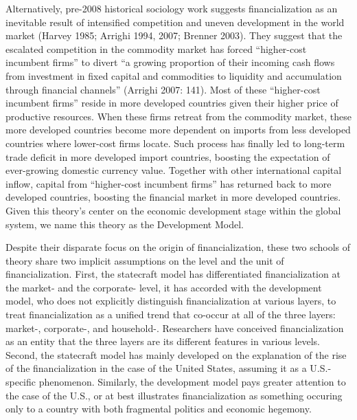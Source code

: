 \documentclass[
]{article}
\begin{document}
Alternatively, pre-2008 historical sociology work suggests
financialization as an inevitable result of intensified competition and
uneven development in the world market (Harvey 1985; Arrighi 1994, 2007;
Brenner 2003). They suggest that the escalated competition in the
commodity market has forced ``higher-cost incumbent firms'' to divert
``a growing proportion of their incoming cash flows from investment in
fixed capital and commodities to liquidity and accumulation through
financial channels'' (Arrighi 2007: 141). Most of these ``higher-cost
incumbent firms'' reside in more developed countries given their higher
price of productive resources. When these firms retreat from the
commodity market, these more developed countries become more dependent
on imports from less developed countries where lower-cost firms locate.
Such process has finally led to long-term trade deficit in more
developed import countries, boosting the expectation of ever-growing
domestic currency value. Together with other international capital
inflow, capital from ``higher-cost incumbent firms'' has returned back
to more developed countries, boosting the financial market in more
developed countries. Given this theory's center on the economic
development stage within the global system, we name this theory as the
Development Model.

Despite their disparate focus on the origin of financialization, these
two schools of theory share two implicit assumptions on the level and
the unit of financialization. First, the statecraft model has
differentiated financialization at the market- and the corporate- level,
it has accorded with the development model, who does not explicitly
distinguish financialization at various layers, to treat
financialization as a unified trend that co-occur at all of the three
layers: market-, corporate-, and household-. Researchers have conceived
financialization as an entity that the three layers are its different
features in various levels. Second, the statecraft model has mainly
developed on the explanation of the rise of the financialization in the
case of the United States, assuming it as a U.S.-specific phenomenon.
Similarly, the development model pays greater attention to the case of
the U.S., or at best illustrates financialization as something occuring
only to a country with both fragmental politics and economic hegemony.
\end{document}
